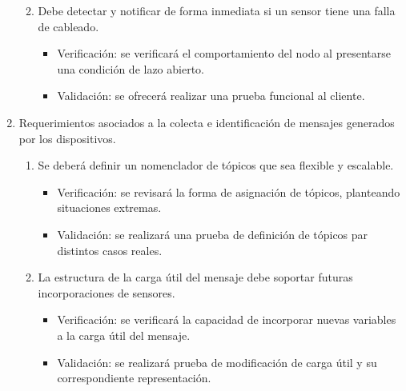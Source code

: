 \documentclass[
11pt, %
]{charter}
\begin{document}
\begin{enumerate}
\begin{enumerate}
\begin{itemize}
			\end{itemize}
			\item Debe detectar y notificar de forma inmediata si un sensor tiene una falla de cableado.
			\begin{itemize}
				\item Verificación: se verificará el comportamiento del nodo al presentarse una condición de lazo abierto.
				\item Validación: se ofrecerá realizar una prueba funcional al cliente.
			\end{itemize}
		\end{enumerate}
		
	\item Requerimientos asociados a la colecta e identificación de mensajes generados por los dispositivos.
		\begin{enumerate}
			\item Se deberá definir un nomenclador de tópicos que sea flexible y escalable.
			\begin{itemize}
				\item Verificación: se revisará la forma de asignación de tópicos, planteando situaciones extremas.
				\item Validación: se realizará una prueba de definición de tópicos par distintos casos reales.
			\end{itemize}
			\item La estructura de la carga útil del mensaje debe soportar futuras  incorporaciones de sensores.
			\begin{itemize}
				\item Verificación: se verificará la capacidad de incorporar nuevas variables a la carga útil del mensaje.
				\item Validación: se realizará prueba de modificación de carga útil y su correspondiente representación.
			\end{itemize}
		\end{enumerate}


\end{enumerate}
\end{document}
